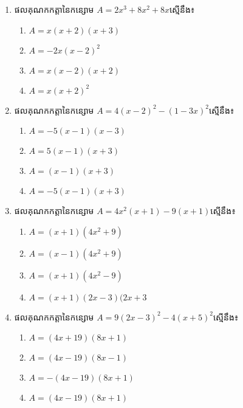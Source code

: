 \begin{enumerate}
\item ផលគុណកកត្តានៃកន្សោម $A=2x^3+8x^2+8x$ស្មើនឹង៖
\begin{multicols}{2}
\begin{enumerate}[label=\alph*.]
\item $A=x(x+2)(x+3)$
\item $A=-2x(x-2)^2$
\item $A=x(x-2)(x+2)$
\item $A=x(x+2)^2$
\end{enumerate}
\end{multicols}

\item ផលគុណកកត្តានៃកន្សោម $A=4(x-2)^2-(1-3x)^2$ស្មើនឹង៖
\begin{multicols}{2}
\begin{enumerate}[label=\alph*.]
\item $A=-5(x-1)(x-3)$
\item $A=5(x-1)(x+3)$
\item $A=(x-1)(x+3)$
\item $A=-5(x-1)(x+3)$
\end{enumerate}
\end{multicols}

\item ផលគុណកកត្តានៃកន្សោម $A=4x^2(x+1)-9(x+1)$ស្មើនឹង៖
\begin{multicols}{2}
\begin{enumerate}[label=\alph*.]
\item $A=(x+1)(4x^2+9)$
\item $A=(x-1)(4x^2+9)$
\item $A=(x+1)(4x^2-9)$
\item $A=(x+1)(2x-3)(2x+3$
\end{enumerate}
\end{multicols}

\item ផលគុណកកត្តានៃកន្សោម $A=9(2x-3)^2-4(x+5)^2$ស្មើនឹង៖
\begin{multicols}{2}
\begin{enumerate}[label=\alph*.]
\item $A=(4x+19)(8x+1)$
\item $A=(4x-19)(8x-1)$
\item $A=-(4x-19)(8x+1)$
\item $A=(4x-19)(8x+1)$
\end{enumerate}
\end{multicols}




\end{enumerate}

